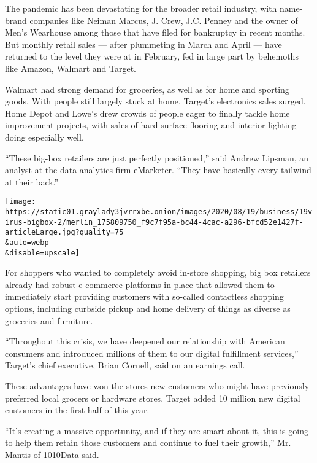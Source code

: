 The pandemic has been devastating for the broader retail industry, with
name-brand companies like
\href{https://www.nytimes3xbfgragh.onion/2020/05/07/business/neiman-marcus-bankruptcy.html?searchResultPosition=1}{Neiman
Marcus}, J. Crew, J.C. Penney and the owner of Men's Wearhouse among
those that have filed for bankruptcy in recent months. But monthly
\href{https://www.nytimes3xbfgragh.onion/2020/08/14/business/retail-sales-coronavirus.html?searchResultPosition=1}{retail
sales} --- after plummeting in March and April --- have returned to the
level they were at in February, fed in large part by behemoths like
Amazon, Walmart and Target.

Walmart had strong demand for groceries, as well as for home and
sporting goods. With people still largely stuck at home, Target's
electronics sales surged. Home Depot and Lowe's drew crowds of people
eager to finally tackle home improvement projects, with sales of hard
surface flooring and interior lighting doing especially well.

``These big-box retailers are just perfectly positioned,'' said Andrew
Lipsman, an analyst at the data analytics firm eMarketer. ``They have
basically every tailwind at their back.''

\texttt{[image: https://static01.graylady3jvrrxbe.onion/images/2020/08/19/business/19virus-bigbox-2/merlin\_175809750\_f9c7f95a-bc44-4cac-a296-bfcd52e1427f-articleLarge.jpg?quality=75\\\&auto=webp\\\&disable=upscale]}

For shoppers who wanted to completely avoid in-store shopping, big box
retailers already had robust e-commerce platforms in place that allowed
them to immediately start providing customers with so-called contactless
shopping options, including curbside pickup and home delivery of things
as diverse as groceries and furniture.

``Throughout this crisis, we have deepened our relationship with
American consumers and introduced millions of them to our digital
fulfillment services,'' Target's chief executive, Brian Cornell, said on
an earnings call.

These advantages have won the stores new customers who might have
previously preferred local grocers or hardware stores. Target added 10
million new digital customers in the first half of this year.

``It's creating a massive opportunity, and if they are smart about it,
this is going to help them retain those customers and continue to fuel
their growth,'' Mr. Mantis of 1010Data said.

